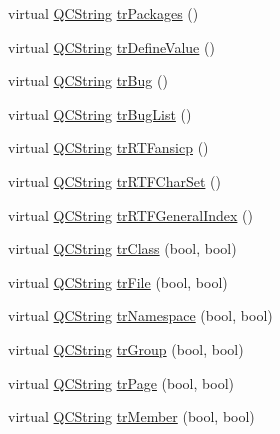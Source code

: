 \begin{DoxyCompactItemize}
\item 
virtual \mbox{\hyperlink{class_q_c_string}{Q\+C\+String}} \mbox{\hyperlink{class_translator_japanese_a4c78ec3aba82e4e5c12bab8f6da15311}{tr\+Packages}} ()
\item 
virtual \mbox{\hyperlink{class_q_c_string}{Q\+C\+String}} \mbox{\hyperlink{class_translator_japanese_a5a68d01de2ed6ab1c5a37596bf7e395d}{tr\+Define\+Value}} ()
\item 
virtual \mbox{\hyperlink{class_q_c_string}{Q\+C\+String}} \mbox{\hyperlink{class_translator_japanese_aefc77d8dc5d731929a925a885f2167ea}{tr\+Bug}} ()
\item 
virtual \mbox{\hyperlink{class_q_c_string}{Q\+C\+String}} \mbox{\hyperlink{class_translator_japanese_a75db1decf69567f638257057f071dd16}{tr\+Bug\+List}} ()
\item 
virtual \mbox{\hyperlink{class_q_c_string}{Q\+C\+String}} \mbox{\hyperlink{class_translator_japanese_a1d3e75d8d22d0d3f04acd4339bba931d}{tr\+R\+T\+Fansicp}} ()
\item 
virtual \mbox{\hyperlink{class_q_c_string}{Q\+C\+String}} \mbox{\hyperlink{class_translator_japanese_a4a63767c84738f67dec5afa48da40760}{tr\+R\+T\+F\+Char\+Set}} ()
\item 
virtual \mbox{\hyperlink{class_q_c_string}{Q\+C\+String}} \mbox{\hyperlink{class_translator_japanese_a077e2e41ece9d5eb8f1312d4acb535f3}{tr\+R\+T\+F\+General\+Index}} ()
\item 
virtual \mbox{\hyperlink{class_q_c_string}{Q\+C\+String}} \mbox{\hyperlink{class_translator_japanese_aa06bfdcdbfe8c2b59abbbb754a9598fe}{tr\+Class}} (bool, bool)
\item 
virtual \mbox{\hyperlink{class_q_c_string}{Q\+C\+String}} \mbox{\hyperlink{class_translator_japanese_ac66c7700778f3d1409d2670c9123e55e}{tr\+File}} (bool, bool)
\item 
virtual \mbox{\hyperlink{class_q_c_string}{Q\+C\+String}} \mbox{\hyperlink{class_translator_japanese_a1112852197d7af74daae91dedd6a6d12}{tr\+Namespace}} (bool, bool)
\item 
virtual \mbox{\hyperlink{class_q_c_string}{Q\+C\+String}} \mbox{\hyperlink{class_translator_japanese_a487dfcdae65de19b8d6f2b77e37b3bfd}{tr\+Group}} (bool, bool)
\item 
virtual \mbox{\hyperlink{class_q_c_string}{Q\+C\+String}} \mbox{\hyperlink{class_translator_japanese_af028c18c284cd40c40a136efc53eab13}{tr\+Page}} (bool, bool)
\item 
virtual \mbox{\hyperlink{class_q_c_string}{Q\+C\+String}} \mbox{\hyperlink{class_translator_japanese_a1ac54c351748990e35f5a3774e58216e}{tr\+Member}} (bool, bool)

\end{DoxyCompactItemize}
